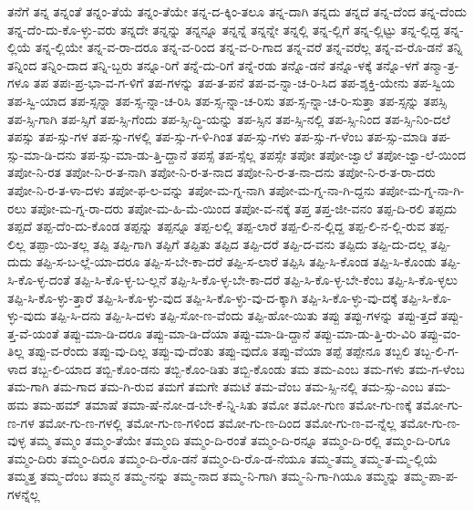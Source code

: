 {ತನೆಗೆ
ತನ್ನ
ತನ್ನಂತೆ
ತನ್ನಂ-ತೆಯೆ
ತನ್ನಂ-ತೆಯೇ
ತನ್ನ-ದ-ಕ್ಕಿಂ-ತಲೂ
ತನ್ನ-ದಾಗಿ
ತನ್ನದು
ತನ್ನದೆ
ತನ್ನ-ದೆಂದ
ತನ್ನ-ದೆಂದು
ತನ್ನ-ದೆಂ-ದು-ಕೊ-ಳ್ಳು-ವರು
ತನ್ನದೇ
ತನ್ನನ್ನು
ತನ್ನನ್ನೂ
ತನ್ನನ್ನೆ
ತನ್ನನ್ನೇ
ತನ್ನಲ್ಲಿ
ತನ್ನ-ಲ್ಲಿಗೆ
ತನ್ನ-ಲ್ಲಿಟ್ಟು
ತನ್ನ-ಲ್ಲಿದ್ದ
ತನ್ನ-ಲ್ಲಿಯೆ
ತನ್ನ-ಲ್ಲಿಯೇ
ತನ್ನ-ವ-ರಾ-ದರೂ
ತನ್ನ-ವ-ರಿಂದ
ತನ್ನ-ವ-ರಿ-ಗಾದ
ತನ್ನ-ವರೆ
ತನ್ನ-ವರೆಲ್ಲ
ತನ್ನ-ವ-ರೊ-ಡನೆ
ತನ್ನಿ
ತನ್ನಿಂದ
ತನ್ನಿಂ-ದಾದ
ತನ್ನಿ-ಬ್ಬರು
ತನ್ನೂ-ರಿಗೆ
ತನ್ನೆ-ದು-ರಿಗೆ
ತನ್ನೆ-ರಡು
ತನ್ನೊ-ಡನೆ
ತನ್ನೊ-ಳಕ್ಕೆ
ತನ್ನೊ-ಳಗೆ
ತನ್ಮಾ-ತ್ರ-ಗಳೂ
ತಪ
ತಪಃ-ಪ್ರ-ಭಾ-ವ-ಗ-ಳಿಗೆ
ತಪ-ಗಳನ್ನು
ತಪ-ತ-ಪನೆ
ತಪ-ವ-ನ್ನಾ-ಚ-ರಿ-ಸಿದ
ತಪ-ಶ್ಶಕ್ತಿ-ಯೇನು
ತಪ-ಸ್ವಿಯ
ತಪ-ಸ್ವಿ-ಯಾದ
ತಪ-ಸ್ಸನ್ನಾ
ತಪ-ಸ್ಸ-ನ್ನಾ-ಚ-ರಿಸಿ
ತಪ-ಸ್ಸ-ನ್ನಾ-ಚ-ರಿಸು
ತಪ-ಸ್ಸ-ನ್ನಾ-ಚ-ರಿ-ಸುತ್ತಾ
ತಪ-ಸ್ಸನ್ನು
ತಪಸ್ಸಿ
ತಪ-ಸ್ಸಿ-ಗಾಗಿ
ತಪ-ಸ್ಸಿಗೆ
ತಪ-ಸ್ಸಿ-ಗೆಂದು
ತಪ-ಸ್ಸಿ-ದ್ಧಿ-ಯನ್ನು
ತಪ-ಸ್ಸಿನ
ತಪ-ಸ್ಸಿ-ನಲ್ಲಿ
ತಪ-ಸ್ಸಿ-ನಿಂದ
ತಪ-ಸ್ಸಿ-ನಿಂ-ದಲೆ
ತಪಸ್ಸು
ತಪ-ಸ್ಸು-ಗಳ
ತಪ-ಸ್ಸು-ಗಳಲ್ಲಿ
ತಪ-ಸ್ಸು-ಗ-ಳಿ-ಗಿಂತ
ತಪ-ಸ್ಸು-ಗಳು
ತಪ-ಸ್ಸು-ಗ-ಳೆಂಬ
ತಪ-ಸ್ಸು-ಮಾಡಿ
ತಪ-ಸ್ಸು-ಮಾ-ಡಿ-ದನು
ತಪ-ಸ್ಸು-ಮಾ-ಡು-ತ್ತಿ-ದ್ದಾನೆ
ತಪಸ್ಸೆ
ತಪ-ಸ್ಸೆಲ್ಲ
ತಪಸ್ಸೇ
ತಪೋ
ತಪೋ-ಜ್ವಾಲೆ
ತಪೋ-ಜ್ವಾ-ಲೆ-ಯಿಂದ
ತಪೋ-ನಿ-ರತ
ತಪೋ-ನಿ-ರ-ತ-ನಾಗಿ
ತಪೋ-ನಿ-ರ-ತ-ನಾದ
ತಪೋ-ನಿ-ರ-ತ-ನಾ-ದನು
ತಪೋ-ನಿ-ರ-ತ-ರಾ-ದರು
ತಪೋ-ನಿ-ರ-ತ-ಳಾ-ದಳು
ತಪೋ-ಫ-ಲ-ವನ್ನು
ತಪೋ-ಮ-ಗ್ನ-ನಾಗಿ
ತಪೋ-ಮ-ಗ್ನ-ನಾ-ಗಿ-ದ್ದನು
ತಪೋ-ಮ-ಗ್ನ-ನಾ-ಗಿ-ರಲು
ತಪೋ-ಮ-ಗ್ನ-ರಾ-ದರು
ತಪೋ-ಮ-ಹಿ-ಮೆ-ಯಿಂದ
ತಪೋ-ವ-ನಕ್ಕೆ
ತಪ್ತ
ತಪ್ತ-ಜೀ-ವನಂ
ತಪ್ಪ-ದಿ-ರಲಿ
ತಪ್ಪದು
ತಪ್ಪದೆ
ತಪ್ಪ-ದೆಂ-ದು-ಕೊಂಡ
ತಪ್ಪನ್ನು
ತಪ್ಪನ್ನೂ
ತಪ್ಪ-ಲಲ್ಲಿ
ತಪ್ಪ-ಲಾರೆ
ತಪ್ಪ-ಲಿ-ನ-ಲ್ಲಿದ್ದ
ತಪ್ಪ-ಲಿ-ನ-ಲ್ಲಿ-ರುವ
ತಪ್ಪ-ಲಿಲ್ಲ
ತಪ್ಪಾ-ಯಿ-ತಲ್ಲ
ತಪ್ಪಿ
ತಪ್ಪಿ-ಗಾಗಿ
ತಪ್ಪಿಗೆ
ತಪ್ಪಿತು
ತಪ್ಪಿದ
ತಪ್ಪಿ-ದರೆ
ತಪ್ಪಿ-ದ-ವನು
ತಪ್ಪಿದು
ತಪ್ಪಿ-ದು-ದಲ್ಲ
ತಪ್ಪಿ-ದುದು
ತಪ್ಪಿ-ಸ-ಬ-ಲ್ಲೆ-ಯಾ-ದರೂ
ತಪ್ಪಿ-ಸ-ಬೇ-ಕಾ-ದರೆ
ತಪ್ಪಿ-ಸ-ಲಾರೆ
ತಪ್ಪಿಸಿ
ತಪ್ಪಿ-ಸಿ-ಕೊಂಡ
ತಪ್ಪಿ-ಸಿ-ಕೊಂಡು
ತಪ್ಪಿ-ಸಿ-ಕೊ-ಳ್ಳ-ದಂತೆ
ತಪ್ಪಿ-ಸಿ-ಕೊ-ಳ್ಳ-ಬ-ಲ್ಲನೆ
ತಪ್ಪಿ-ಸಿ-ಕೊ-ಳ್ಳ-ಬೇ-ಕಾ-ದರೆ
ತಪ್ಪಿ-ಸಿ-ಕೊ-ಳ್ಳ-ಬೇ-ಕೆಂಬ
ತಪ್ಪಿ-ಸಿ-ಕೊ-ಳ್ಳಲು
ತಪ್ಪಿ-ಸಿ-ಕೊ-ಳ್ಳು-ತ್ತಾರೆ
ತಪ್ಪಿ-ಸಿ-ಕೊ-ಳ್ಳು-ವುದ
ತಪ್ಪಿ-ಸಿ-ಕೊ-ಳ್ಳು-ವು-ದ-ಕ್ಕಾಗಿ
ತಪ್ಪಿ-ಸಿ-ಕೊ-ಳ್ಳು-ವು-ದಕ್ಕೆ
ತಪ್ಪಿ-ಸಿ-ಕೊ-ಳ್ಳು-ವುದು
ತಪ್ಪಿ-ಸಿ-ದನು
ತಪ್ಪಿ-ಸಿ-ದಳು
ತಪ್ಪಿ-ಸೋ-ಣ-ವೆಂದು
ತಪ್ಪಿ-ಹೋ-ಯಿತು
ತಪ್ಪು
ತಪ್ಪು-ಗಳನ್ನು
ತಪ್ಪು-ತ್ತದೆ
ತಪ್ಪು-ತ್ತ-ವೆ-ಯಂತೆ
ತಪ್ಪು-ಮಾ-ಡಿ-ದರೂ
ತಪ್ಪು-ಮಾ-ಡಿ-ದೆಯಾ
ತಪ್ಪು-ಮಾ-ಡಿ-ದ್ದಾನೆ
ತಪ್ಪು-ಮಾ-ಡು-ತ್ತಿ-ರು-ವಿರಿ
ತಪ್ಪು-ವಂ-ತಿಲ್ಲ
ತಪ್ಪು-ವ-ರೆಂದು
ತಪ್ಪು-ವು-ದಿಲ್ಲ
ತಪ್ಪು-ವು-ದೆಂತು
ತಪ್ಪು-ವುದೊ
ತಪ್ಪು-ವೆಯಾ
ತಪ್ಪೆ
ತಪ್ಪೇನೂ
ತಬ್ಬಲಿ
ತಬ್ಬ-ಲಿ-ಗ-ಳಾದ
ತಬ್ಬ-ಲಿ-ಯಾದ
ತಬ್ಬಿ-ಕೊಂ-ಡನು
ತಬ್ಬಿ-ಕೊಂ-ಡಿತು
ತಬ್ಬಿ-ಕೊಂಡು
ತಮ
ತಮ-ಎಂಬ
ತಮ-ಗಳು
ತಮ-ಗ-ಳೆಂಬ
ತಮ-ಗಾಗಿ
ತಮ-ಗಾದ
ತಮ-ಗಿ-ರುವ
ತಮಗೆ
ತಮಗೇ
ತಮಟೆ
ತಮ-ವೆಂಬ
ತಮ-ಸ್ಸಿ-ನಲ್ಲಿ
ತಮ-ಸ್ಸು-ಎಂಬ
ತಮ-ಹಮ
ತಮ-ಹಮ್
ತಮಾಷೆ
ತಮಾ-ಷೆ-ನೋ-ಡ-ಬೇ-ಕೆ-ನ್ನಿ-ಸಿತು
ತಮೋ
ತಮೋ-ಗುಣ
ತಮೋ-ಗು-ಣಕ್ಕೆ
ತಮೋ-ಗು-ಣ-ಗಳ
ತಮೋ-ಗು-ಣ-ಗಳಲ್ಲಿ
ತಮೋ-ಗು-ಣ-ಗಳಿಂದ
ತಮೋ-ಗು-ಣ-ದಿಂದ
ತಮೋ-ಗು-ಣ-ವ-ನ್ನೆಲ್ಲ
ತಮೋ-ಗು-ಣ-ವುಳ್ಳ
ತಮ್ಮ
ತಮ್ಮಂ
ತಮ್ಮಂ-ತೆಯೇ
ತಮ್ಮಂದಿ
ತಮ್ಮಂ-ದಿ-ರಂತೆ
ತಮ್ಮಂ-ದಿ-ರನ್ನೂ
ತಮ್ಮಂ-ದಿ-ರಲ್ಲಿ
ತಮ್ಮಂ-ದಿ-ರಿಗೂ
ತಮ್ಮಂ-ದಿರು
ತಮ್ಮಂ-ದಿರೂ
ತಮ್ಮಂ-ದಿ-ರೊ-ಡನೆ
ತಮ್ಮಂ-ದಿ-ರೊ-ಡ-ನೆಯೂ
ತಮ್ಮ-ತಮ್ಮ
ತಮ್ಮ-ತ-ಮ್ಮ-ಲ್ಲಿಯೆ
ತಮ್ಮತ್ತ
ತಮ್ಮ-ದೆಂಬ
ತಮ್ಮನ
ತಮ್ಮ-ನನ್ನು
ತಮ್ಮ-ನಾದ
ತಮ್ಮ-ನಿ-ಗಾಗಿ
ತಮ್ಮ-ನಿ-ಗಾ-ಗಿಯೂ
ತಮ್ಮನ್ನು
ತಮ್ಮ-ಪಾ-ಪ-ಗಳನ್ನೆಲ್ಲ
}
